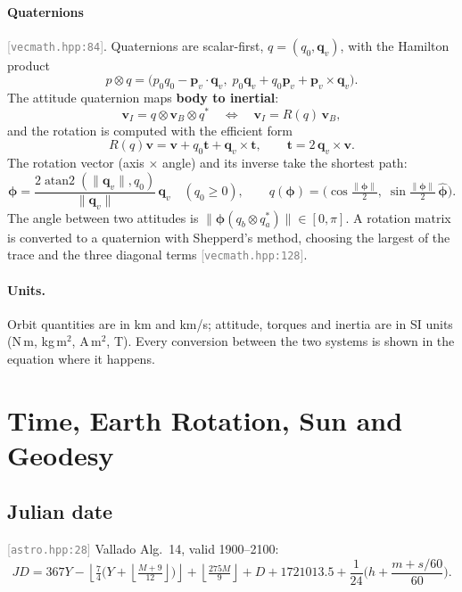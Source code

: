 \documentclass[11pt,a4paper]{article}
\newcommand{\vb}[1]{\boldsymbol{#1}}
\newcommand{\uv}[1]{\hat{\boldsymbol{#1}}}
\newcommand{\src}[1]{\textcolor{gray}{\small[\texttt{#1}]}}
\begin{document}
\paragraph{Quaternions} \src{vecmath.hpp:84}. Quaternions are scalar-first, $q = (q_0, \vb q_v)$, with the Hamilton product
\begin{equation}
p\otimes q = \big(p_0 q_0 - \vb p_v\cdot\vb q_v,\; p_0\vb q_v + q_0\vb p_v + \vb p_v\times\vb q_v\big).
\end{equation}
The attitude quaternion maps \textbf{body to inertial}:
\begin{equation}
\vb v_I = q\otimes\vb v_B\otimes q^{*}
\quad\Longleftrightarrow\quad
\vb v_I = R(q)\,\vb v_B,
\end{equation}
and the rotation is computed with the efficient form
\begin{equation}
R(q)\vb v = \vb v + q_0\vb t + \vb q_v\times\vb t,\qquad \vb t = 2\,\vb q_v\times\vb v.
\end{equation}
The rotation vector (axis $\times$ angle) and its inverse take the shortest path:
\begin{equation}
\vb\phi = \frac{2\operatorname{atan2}(\lVert\vb q_v\rVert, q_0)}{\lVert\vb q_v\rVert}\,\vb q_v\quad(q_0\ge0),\qquad
q(\vb\phi) = \Big(\cos\tfrac{\lVert\vb\phi\rVert}{2},\; \sin\tfrac{\lVert\vb\phi\rVert}{2}\,\uv\phi\Big).
\end{equation}
The angle between two attitudes is $\lVert\vb\phi(q_b\otimes q_a^{*})\rVert\in[0,\pi]$. A rotation matrix is converted to a quaternion with Shepperd's method, choosing the largest of the trace and the three diagonal terms \src{vecmath.hpp:128}.

\paragraph{Units.} Orbit quantities are in km and km/s; attitude, torques and inertia are in SI units (N\,m, kg\,m$^2$, A\,m$^2$, T). Every conversion between the two systems is shown in the equation where it happens.

\section{Time, Earth Rotation, Sun and Geodesy}

\subsection{Julian date} \src{astro.hpp:28}
Vallado Alg.~14, valid 1900--2100:
\begin{equation}
JD = 367Y - \left\lfloor \tfrac{7}{4}\Big(Y + \left\lfloor\tfrac{M+9}{12}\right\rfloor\Big)\right\rfloor + \left\lfloor\tfrac{275M}{9}\right\rfloor + D + 1721013.5 + \frac{1}{24}\Big(h + \frac{m + s/60}{60}\Big).
\end{equation}
\end{document}

